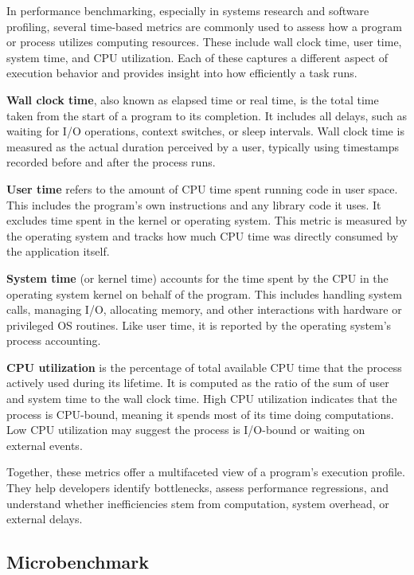 \documentclass[12pt]{report}
\begin{document}
\begin{doublespace}
In performance benchmarking, especially in systems research and software profiling, several time-based metrics are commonly used to assess how a program or process utilizes computing resources. These include wall clock time, user time, system time, and CPU utilization. Each of these captures a different aspect of execution behavior and provides insight into how efficiently a task runs.

\textbf{Wall clock time}, also known as elapsed time or real time, is the total time taken from the start of a program to its completion. It includes all delays, such as waiting for I/O operations, context switches, or sleep intervals. Wall clock time is measured as the actual duration perceived by a user, typically using timestamps recorded before and after the process runs.

\textbf{User time} refers to the amount of CPU time spent running code in user space. This includes the program’s own instructions and any library code it uses. It excludes time spent in the kernel or operating system. This metric is measured by the operating system and tracks how much CPU time was directly consumed by the application itself.

\textbf{System time} (or kernel time) accounts for the time spent by the CPU in the operating system kernel on behalf of the program. This includes handling system calls, managing I/O, allocating memory, and other interactions with hardware or privileged OS routines. Like user time, it is reported by the operating system’s process accounting.

\textbf{CPU utilization} is the percentage of total available CPU time that the process actively used during its lifetime. It is computed as the ratio of the sum of user and system time to the wall clock time. High CPU utilization indicates that the process is CPU-bound, meaning it spends most of its time doing computations. Low CPU utilization may suggest the process is I/O-bound or waiting on external events.

Together, these metrics offer a multifaceted view of a program’s execution profile. They help developers identify bottlenecks, assess performance regressions, and understand whether inefficiencies stem from computation, system overhead, or external delays.


\subsection{Microbenchmark}


\end{doublespace}
\end{document}
